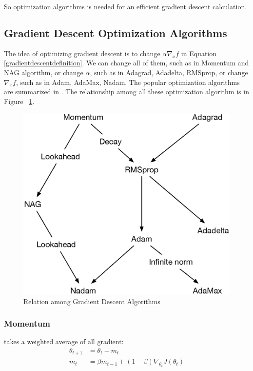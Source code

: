 So optimization algorithms is needed for an efficient gradient descent calculation.

\subsection{Gradient Descent Optimization Algorithms}

The idea of optimizing gradient descent is to change $\alpha \nabla_x f$ in Equation \eqref{gradientdescentdefinition}. We can change all of them, such as in Momentum and NAG algorithm, or change $\alpha$, such as in Adagrad, Adadelta, RMSprop, or change $\nabla_x f$, such as in Adam, AdaMax, Nadam. The popular optimization algorithms are summarized in \cite{Ruder2016}. The relationship among all these optimization algorithm is in Figure ~\ref{gradientdescentoptimizationalgorithmrelationship}.

\begin{figure}[H]
    \centering
    \includegraphics[scale=0.5]{images/relation_among_gradient_descent}
    \caption{Relation among Gradient Descent Algorithms}
    \label{gradientdescentoptimizationalgorithmrelationship}
\end{figure}


\subsubsection{Momentum}

\cite{Qian1999} takes a weighted average of all gradient:
\begin{equation}
    \begin{aligned}
        \theta_{t+1} &= \theta_t - m_t \\
        m_t &= \beta m_{t-1} + (1-\beta) \nabla_{\theta_t} J(\theta_t)
    \end{aligned}
\end{equation}

